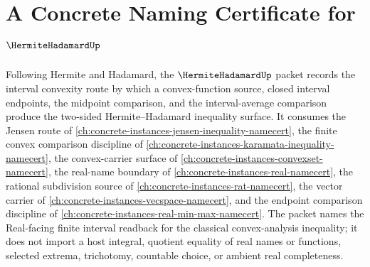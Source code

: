 \chapter{A Concrete Naming Certificate for $\HermiteHadamardUp$}
\label{ch:concrete-instances-hermite-hadamard-namecert}

Following Hermite and Hadamard, the $\HermiteHadamardUp$ packet records the interval convexity route by which a convex-function source, closed interval endpoints, the midpoint comparison, and the interval-average comparison produce the two-sided Hermite--Hadamard inequality surface. It consumes the Jensen route of \autoref{ch:concrete-instances-jensen-inequality-namecert}, the finite convex comparison discipline of \autoref{ch:concrete-instances-karamata-inequality-namecert}, the convex-carrier surface of \autoref{ch:concrete-instances-convexset-namecert}, the real-name boundary of \autoref{ch:concrete-instances-real-namecert}, the rational subdivision source of \autoref{ch:concrete-instances-rat-namecert}, the vector carrier of \autoref{ch:concrete-instances-vecspace-namecert}, and the endpoint comparison discipline of \autoref{ch:concrete-instances-real-min-max-namecert}. The packet names the Real-facing finite interval readback for the classical convex-analysis inequality; it does not import a host integral, quotient equality of real names or functions, selected extrema, trichotomy, countable choice, or ambient real completeness.

